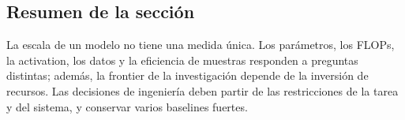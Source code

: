 \subsection{Resumen de la sección}

La escala de un modelo no tiene una medida única. Los parámetros, los FLOPs, la activation, los datos y la eficiencia de muestras responden a preguntas distintas; además, la frontier de la investigación depende de la inversión de recursos. Las decisiones de ingeniería deben partir de las restricciones de la tarea y del sistema, y conservar varios baselines fuertes.
